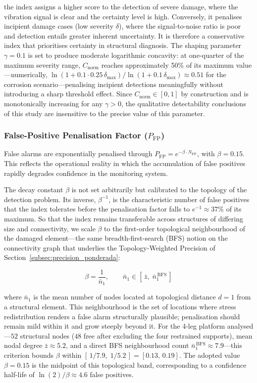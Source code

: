 \documentclass[a4paper,fleqn,nologo]{cas-dc}
\begin{document}
\noindent the index assigns a higher score to the detection of severe damage, where the vibration signal is clear and the certainty level is high. Conversely, it penalises incipient damage cases (low severity $\delta$), where the signal-to-noise ratio is poor and detection entails greater inherent uncertainty. It is therefore a conservative index that prioritises certainty in structural diagnosis. The shaping parameter $\gamma = 0.1$ is set to produce moderate logarithmic concavity: at one-quarter of the maximum severity range, $C_{\text{norm}}$ reaches approximately 50\% of its maximum value---numerically, $\ln(1+0.1\cdot0.25\,\delta_{\max})/\ln(1+0.1\,\delta_{\max})\approx 0.51$ for the corrosion scenario---penalising incipient detections meaningfully without introducing a sharp threshold effect. Since $C_{\text{norm}}\in[0,1]$ by construction and is monotonically increasing for any $\gamma>0$, the qualitative detectability conclusions of this study are insensitive to the precise value of this parameter.

\subsubsection{False-Positive Penalisation Factor (\texorpdfstring{$P_{\text{FP}}$}{Pfp})}
False alarms are exponentially penalised through $P_{\text{FP}} = e^{-\beta \cdot N_{\text{FP}}}$, with $\beta = 0.15$. This reflects the operational reality in which the accumulation of false positives rapidly degrades confidence in the monitoring system.

The decay constant $\beta$ is not set arbitrarily but calibrated to the topology of the detection problem. Its inverse, $\beta^{-1}$, is the characteristic number of false positives that the index tolerates before the penalisation factor falls to $e^{-1}\approx 37\%$ of its maximum. So that the index remains transferable across structures of differing size and connectivity, we scale $\beta$ to the first-order topological neighbourhood of the damaged element---the same breadth-first-search (BFS) notion on the connectivity graph that underlies the Topology-Weighted Precision of Section~\ref{subsec:precision_ponderada}:

\begin{equation}
    \label{eq:beta_calibration}
    \beta = \frac{1}{\bar{n}_1}, \qquad \bar{n}_1 \in \left[\,\bar{z},\; \bar{n}_1^{\,\text{BFS}}\,\right]
\end{equation}

\noindent where $\bar{n}_1$ is the mean number of nodes located at topological distance $d=1$ from a structural element. This neighbourhood is the set of locations where stress redistribution renders a false alarm structurally plausible; penalisation should remain mild within it and grow steeply beyond it. For the 4-leg platform analysed---$52$ structural nodes ($48$ free after excluding the four restrained supports), mean nodal degree $\bar{z}\approx 5.2$, and a direct BFS neighbourhood count $\bar{n}_1^{\,\text{BFS}}\approx 7.9$---this criterion bounds $\beta$ within $[\,1/7.9,\;1/5.2\,]=[0.13,\,0.19]$. The adopted value $\beta=0.15$ is the midpoint of this topological band, corresponding to a confidence half-life of $\ln(2)/\beta\approx 4.6$ false positives.
\end{document}
